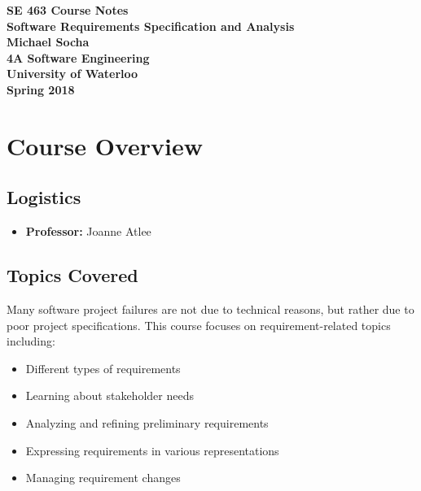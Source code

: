 \documentclass[12pt,titlepage]{article}
\begin{document}
  \begin{titlepage}
    \vspace*{\fill}
    \centering

    \textbf{\Huge SE 463 Course Notes} \\ [0.4em]
    \textbf{\Large Software Requirements Specification and Analysis} \\ [1em]
    \textbf{\Large Michael Socha} \\ [1em]
    \textbf{\large 4A Software Engineering} \\
    \textbf{\large University of Waterloo} \\
    \textbf{\large Spring 2018} \\
    \vspace*{\fill}
  \end{titlepage}

  \newpage 

  \tableofcontents

  \newpage

  \section{Course Overview}
    \subsection{Logistics}
      \begin{itemize}
        \item \textbf{Professor:} Joanne Atlee
      \end{itemize}

    \subsection{Topics Covered}
      Many software project failures are not due to technical reasons, but rather due to poor project specifications. This course
      focuses on requirement-related topics including:
      \begin{itemize}
        \item Different types of requirements
        \item Learning about stakeholder needs
        \item Analyzing and refining preliminary requirements
        \item Expressing requirements in various representations
        \item Managing requirement changes
      \end{itemize}
\end{document}
